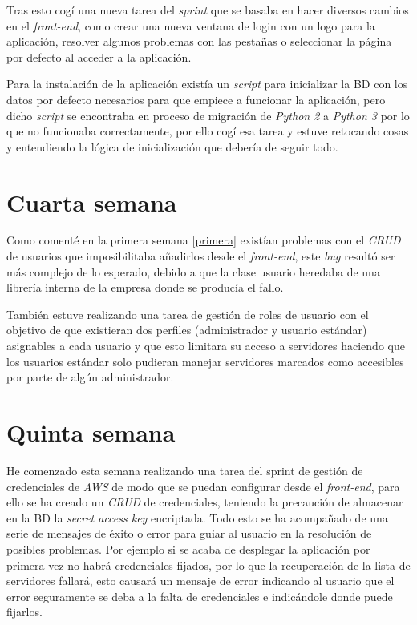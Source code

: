Tras esto cogí una nueva tarea del \textit{sprint} que se basaba en hacer diversos cambios en el \textit{front-end}, como crear una nueva ventana de login con un logo para la aplicación, resolver algunos problemas con las pestañas o seleccionar la página por defecto al acceder a la aplicación.

Para la instalación de la aplicación existía un \textit{script} para inicializar la BD con los datos por defecto necesarios para que empiece a funcionar la aplicación, pero dicho \textit{script} se encontraba en proceso de migración de \textit{Python 2} a \textit{Python 3} por lo que no funcionaba correctamente, por ello cogí esa tarea y estuve retocando cosas y entendiendo la lógica de inicialización que debería de seguir todo.

\section{Cuarta semana}

Como comenté en la primera semana \ref{primera} existían problemas con el \textit{CRUD} de usuarios que imposibilitaba añadirlos desde el \textit{front-end}, este \textit{bug} resultó ser más complejo de lo esperado, debido a que la clase usuario heredaba de una librería interna de la empresa donde se producía el fallo. 

También estuve realizando una tarea de gestión de roles de usuario con el objetivo de que existieran dos perfiles (administrador y usuario estándar) asignables a cada usuario y que esto limitara su acceso a servidores haciendo que los usuarios estándar solo pudieran manejar servidores marcados como accesibles por parte de algún administrador.

\section{Quinta semana}

He comenzado esta semana realizando una tarea del sprint de gestión de credenciales de \textit{AWS} de modo que se puedan configurar desde el \textit{front-end}, para ello se ha creado un \textit{CRUD} de credenciales, teniendo la precaución de almacenar en la BD la \textit{secret access key} encriptada. Todo esto se ha acompañado de una serie de mensajes de éxito o error para guiar al usuario en la resolución de posibles problemas. Por ejemplo si se acaba de desplegar la aplicación por primera vez no habrá credenciales fijados, por lo que la recuperación de la lista de servidores fallará, esto causará un mensaje de error indicando al usuario que el error seguramente se deba a la falta de credenciales e indicándole donde puede fijarlos.

